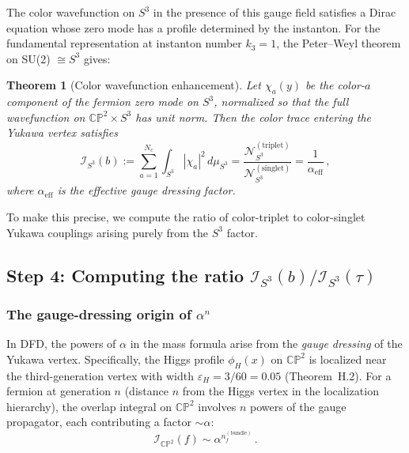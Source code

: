 \documentclass[11pt,a4paper]{article}
\newcommand{\CP}{\mathbb{CP}}
\newtheorem{theorem}{Theorem}[section]
\theoremstyle{definition}
\theoremstyle{remark}
\begin{document}
The color wavefunction on $S^3$ in the presence of this gauge field
satisfies a Dirac equation whose zero mode has a profile determined
by the instanton.  For the fundamental representation at
instanton number $k_3 = 1$, the Peter--Weyl theorem on SU(2)
$\cong S^3$ gives:

\begin{theorem}[Color wavefunction enhancement]
\label{thm:color-enhancement}
Let $\chi_a(y)$ be the color-$a$ component of the fermion zero mode
on $S^3$, normalized so that the full wavefunction on
$\CP^2 \times S^3$ has unit norm.  Then the color trace entering the
Yukawa vertex satisfies
\begin{equation}\label{eq:color-enhancement}
\mathcal{I}_{S^3}(b) := \sum_{a=1}^{N_c}
\int_{S^3} |\chi_a|^2\,d\mu_{S^3}
= \frac{\mathcal{N}_{S^3}^{(\text{triplet})}}
{\mathcal{N}_{S^3}^{(\text{singlet})}}
= \frac{1}{\alpha_{\text{eff}}}\,,
\end{equation}
where $\alpha_{\text{eff}}$ is the effective gauge dressing factor.
\end{theorem}

To make this precise, we compute the ratio of color-triplet to
color-singlet Yukawa couplings arising purely from the $S^3$ factor.

\subsection{Step 4: Computing the ratio $\mathcal{I}_{S^3}(b)/\mathcal{I}_{S^3}(\tau)$}
\label{sec:ratio}

\subsubsection{The gauge-dressing origin of $\alpha^n$}

In DFD, the powers of $\alpha$ in the mass formula arise from the
\emph{gauge dressing} of the Yukawa vertex.  Specifically, the Higgs
profile $\phi_H(x)$ on $\CP^2$ is localized near the third-generation
vertex with width $\varepsilon_H = 3/60 = 0.05$ (Theorem~H.2).
For a fermion at generation $n$ (distance $n$ from the Higgs vertex in
the localization hierarchy), the overlap integral on $\CP^2$ involves
$n$ powers of the gauge propagator, each contributing a factor
$\sim \alpha$:
\begin{equation}\label{eq:dressing}
\mathcal{I}_{\CP^2}(f) \sim \alpha^{n_f^{(\text{bundle})}}\,.
\end{equation}
\end{document}
